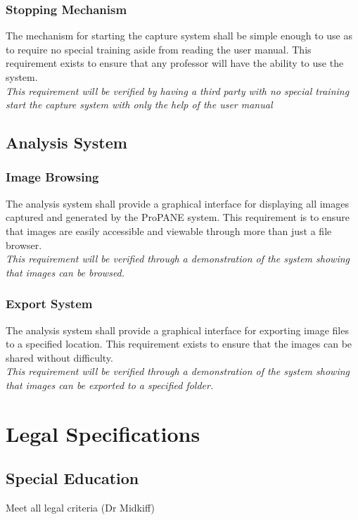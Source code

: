 \documentclass[]{article}
\begin{document}
			\subsubsection{Stopping Mechanism}
				The mechanism for starting the capture system shall be simple enough to use as to require no special training aside from reading the user manual. This requirement exists to ensure that any professor will have the ability to use the system.\\
				\emph{This requirement will be verified by having a third party with no special training start the capture system with only the help of the user manual}
		
		\subsection{Analysis System}
		
			\subsubsection{Image Browsing}
				The analysis system shall provide a graphical interface for displaying all images captured and generated by the ProPANE system. This requirement is to ensure that images are easily accessible and viewable through more than just a file browser.\\
				\emph{This requirement will be verified through a demonstration of the system showing that images can be browsed.}
				
			\subsubsection{Export System}
				The analysis system shall provide a graphical interface for exporting image files to a specified location. This requirement exists to ensure that the images can be shared without difficulty.\\
				\emph{This requirement will be verified through a demonstration of the system showing that images can be exported to a specified folder.}
			
	\section{Legal Specifications}
	
		\subsection{Special Education}
			Meet all legal criteria (Dr Midkiff)
	

		
\end{document}
